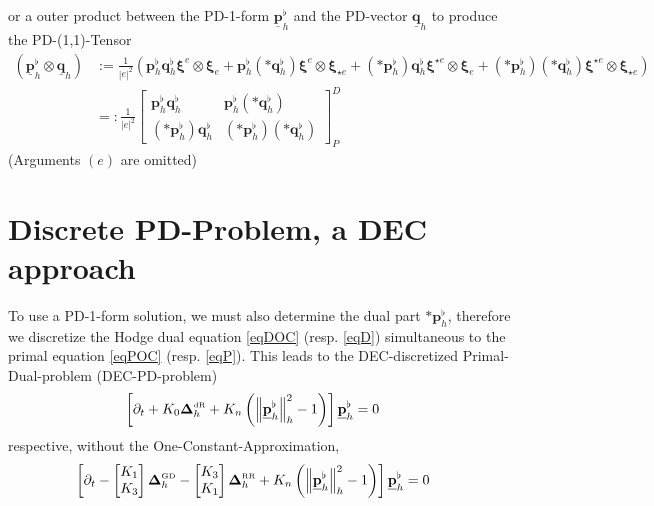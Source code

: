 \documentclass[a4paper,11pt]{scrartcl}
\newcommand{\pflh}{\mathbf{p}^{\flat}_{h}}
\newcommand{\qflh}{\mathbf{q}^{\flat}_{h}}
\newcommand{\PDpflh}{\underline{\mathbf{p}}^{\flat}_{h}}
\newcommand{\PDqh}{\underline{\mathbf{q}}_{h}}
\newcommand{\LB}{\boldsymbol{\Delta}^{\text{\tiny RR}}}
\newcommand{\LCB}{\boldsymbol{\Delta}^{\text{\tiny GD}}}
\newcommand{\LDR}{\boldsymbol{\Delta}^{\text{\tiny dR}}}
\newcommand{\LBh}{\LB_{h}}
\newcommand{\LCBh}{\LCB_{h}}
\newcommand{\LDRh}{\LDR_{h}}
\newcommand{\PDxi}{\boldsymbol{\xi}}
\begin{document}
    or a outer product between the PD-1-form \( \PDpflh \) and the PD-vector  \( \PDqh \) to produce the PD-(1,1)-Tensor
    \begin{align}
      \left(\PDpflh \otimes \PDqh\right) 
          &:= \frac{1}{\left| e \right|^{2}} \left( \pflh\qflh \PDxi^{e}\otimes\PDxi_{e} 
                                                   +\pflh(*\qflh) \PDxi^{e}\otimes\PDxi_{\star e}
                                                   +(*\pflh)\qflh \PDxi^{\star e}\otimes\PDxi_{e}
                                                   +(*\pflh)(*\qflh)\PDxi^{\star e}\otimes\PDxi_{\star e}\right)\\
          &=: \frac{1}{\left| e \right|^{2}} 
            \begin{bmatrix}
              \pflh\qflh & \pflh(*\qflh) \\
              (*\pflh)\qflh & (*\pflh)(*\qflh)
            \end{bmatrix}^{D}_{P} 
    \end{align}
    (Arguments \( (e) \) are omitted)


\section{Discrete PD-Problem, a DEC approach}
  To use a PD-1-form solution, we must also determine the dual part \( *\pflh \), 
  therefore we discretize the Hodge dual equation \eqref{eqDOC} (resp. \eqref{eqD}) simultaneous to the primal equation
  \eqref{eqPOC} (resp. \eqref{eqP}).
  This leads to the DEC-discretized Primal-Dual-problem (DEC-PD-problem) 
  \begin{align}
    \left[ \partial_{t} + K_{0}\LDRh + K_{n}\left( \left\| \PDpflh \right\|_{h}^{2} - 1 \right) \right]\PDpflh &= 0
  \end{align}
  respective, without the One-Constant-Approximation,  
  \begin{align}
    \left[ \partial_{t} -   
            \begin{bmatrix}
               K_{1} \\ K_{3}
            \end{bmatrix} \LCBh
            -\begin{bmatrix}
               K_{3} \\ K_{1}
            \end{bmatrix} \LBh
    + K_{n}\left( \left\| \PDpflh \right\|_{h}^{2} - 1 \right) \right]\PDpflh &= 0
  \end{align}
\end{document}
